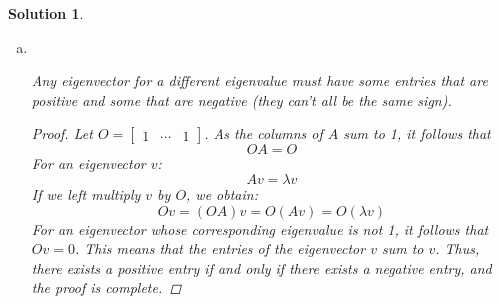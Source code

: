 \documentclass[11pt]{scrartcl}
\theoremstyle{dotlessP}
\newtheorem{sol}{Solution}[section]
\theoremstyle{dotlessN}
\begin{document}
\begin{sol}
\begin{enumerate}[a)]
\begin{proof}
			\end{proof}
		\item \
			\begin{claim}
				Any eigenvector for a different eigenvalue must have some entries that are positive and some that are negative (they can't all be the same sign).
			\end{claim}
			\begin{proof}
				Let $O = 
\begin{bmatrix}
	1 & \cdots & 1
\end{bmatrix}$. As the columns of $A$ sum to 1, it follows that 
				\[
				OA = O
				\] 
				For an eigenvector $v$:
				\[
				Av = \lambda v
				\] 
				If we left multiply $v$ by $O$, we obtain:
				\[
				Ov = (OA)v = O(Av) = O(\lambda v)
				\] 
				For an eigenvector whose corresponding eigenvalue is not 1, it follows that $Ov = 0$. This means that the entries of the eigenvector $v$ sum to $v$. Thus, there exists a positive entry if and only if there exists a negative entry, and the proof is complete.
			\end{proof}
	\end{enumerate}
\end{sol}
\end{document}
